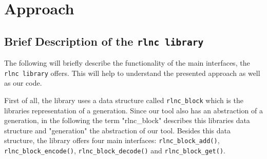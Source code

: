 \documentclass[a4paper,english,10pt]{tumarticle}
\begin{document}
\section{Approach}\label{app}

\subsection{Brief Description of the \texttt{rlnc library}}\label{app:desc}
The following will briefly describe the functionality of the main interfaces, the \texttt{rlnc library} offers.
This will help to understand the presented approach as well as our code.

First of all, the library uses a data structure called \texttt{rlnc\_block} which is the libraries representation of a generation.
Since our tool also has an abstraction of a generation, in the following the term "rlnc\_block" describes this libraries data structure and 
"generation" the abstraction of our tool. Besides this data structure, the library offers four main interfaces: 
\texttt{rlnc\_block\_add()}, \texttt{rlnc\_block\_encode()}, \texttt{rlnc\_block\_decode()} and \texttt{rlnc\_block\_get()}.
\end{document}
